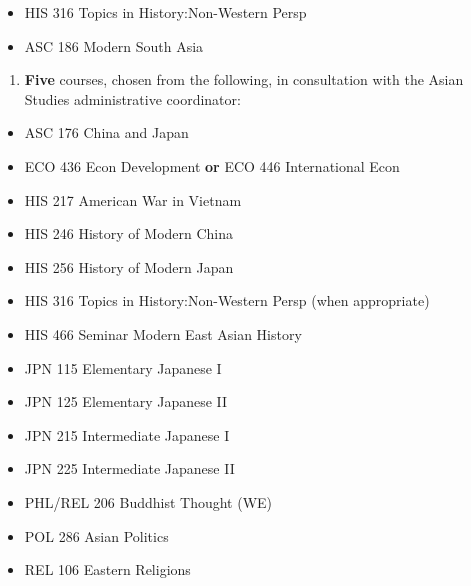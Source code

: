 \documentclass[
  letterpaper,
]{scrbook}
\providecommand{\tightlist}{%
  \setlength{\itemsep}{0pt}\setlength{\parskip}{0pt}}
\begin{document}
\begin{itemize}
\tightlist
\item
  HIS 316 Topics in History:Non-Western Persp\\
\item
  ASC 186 Modern South Asia
\end{itemize}

\begin{enumerate}
\def\labelenumi{\arabic{enumi}.}
\setcounter{enumi}{1}
\tightlist
\item
  \textbf{Five} courses, chosen from the following, in consultation with
  the Asian Studies administrative coordinator:
\end{enumerate}

\begin{itemize}
\tightlist
\item
  ASC 176 China and Japan\\
\item
  ECO 436 Econ Development \textbf{or} ECO 446 International Econ\\
\item
  HIS 217 American War in Vietnam\\
\item
  HIS 246 History of Modern China\\
\item
  HIS 256 History of Modern Japan\\
\item
  HIS 316 Topics in History:Non-Western Persp (when appropriate)\\
\item
  HIS 466 Seminar Modern East Asian History\\
\item
  JPN 115 Elementary Japanese I\\
\item
  JPN 125 Elementary Japanese II\\
\item
  JPN 215 Intermediate Japanese I\\
\item
  JPN 225 Intermediate Japanese II\\
\item
  PHL/REL 206 Buddhist Thought (WE)\\
\item
  POL 286 Asian Politics\\
\item
  REL 106 Eastern Religions
\end{itemize}
\end{document}

